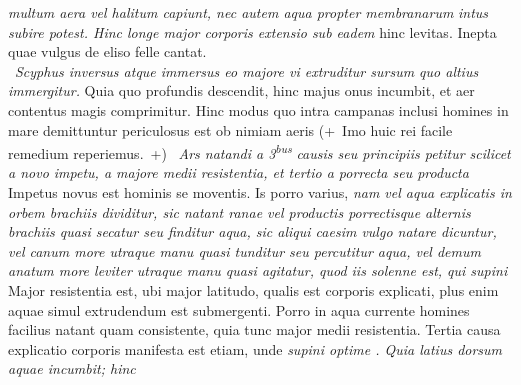 \textit{multum aera vel halitum capiunt, nec autem aqua propter membranarum} %
\textit{intus subire potest. Hinc longe major corporis extensio sub eadem } hinc levitas. Inepta quae vulgus de eliso felle cantat.\\
\indent
{} \,
\textit{Scyphus inversus\protect{} atque immersus eo majore vi extruditur sursum quo altius immergitur.} Quia quo profundis descendit, hinc majus onus incumbit, et aer contentus magis comprimitur. Hinc modus quo intra campanas inclusi homines in mare demittuntur periculosus est ob nimiam aeris 
(+~Imo huic rei facile remedium reperiemus.~+)
\pend 
\count{}
\count{}
\count{}
\pstart {} \,
\textit{Ars natandi\protect{} a 3}\textsuperscript{\textit{bus}}\textit{ causis seu principiis petitur scilicet a novo impetu, a majore medii resistentia, et tertio a porrecta seu producta } Impetus novus est hominis se moventis. Is porro varius, \textit{nam vel aqua explicatis in orbem brachiis dividitur, sic natant ranae vel productis porrectisque alternis brachiis quasi secatur seu finditur aqua, sic aliqui caesim vulgo natare dicuntur, vel canum more utraque manu quasi tunditur seu percutitur aqua, vel demum anatum more leviter utraque manu quasi agitatur, quod iis solenne est, qui supini } Major resistentia est, ubi major latitudo, qualis est corporis explicati, plus enim aquae simul extrudendum est submergenti. Porro in aqua currente homines facilius natant quam consistente, quia tunc major medii resistentia. Tertia causa explicatio corporis manifesta est etiam, unde \textit{supini optime . Quia latius dorsum aquae incumbit; hinc} \edtext{[\textit{aptiores}}{\lemma{[\textit{aptiores}]}\Cfootnote{a.a.O.\cite{00044}, S. 296.}} \hspace{-1.2mm}

